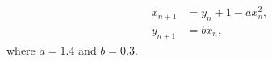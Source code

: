 \begin{align}
  x_{n+1} &= y_n+1-ax_n^2, \label{eq:henon-map-x} \\
  y_{n+1} &= bx_n, \label{eq:henon-map-y}
\end{align}
where $a = 1.4$ and $b = 0.3$.
